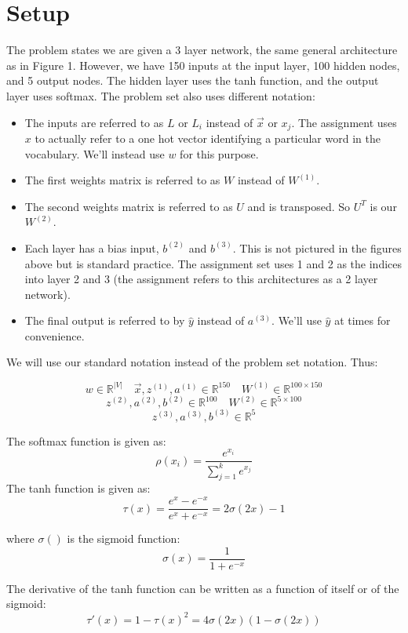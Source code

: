 \documentclass[]{article}
\begin{document}
\section{Setup}
The problem states we are given a 3 layer network, the same general architecture as in Figure 1. However, we have 150 inputs at the input layer, 100 hidden nodes, and 5 output nodes. The hidden layer uses the tanh function, and the output layer uses softmax. The problem set also uses different notation:
\begin{itemize}
	\item The inputs are referred to as $L$ or $L_i$ instead of $\vec{x}$ or $x_j$. The assignment uses $x$ to actually refer to a one hot vector identifying a particular word in the vocabulary. We'll instead use $w$ for this purpose.
	\item The first weights matrix is referred to as $W$ instead of $W^{(1)}$.
	\item The second weights matrix is referred to as $U$ and is transposed. So $U^T$ is our $W^{(2)}$.
	\item Each layer has a bias input, $b^{(2)}$ and $b^{(3)}$. This is not pictured in the figures above but is standard practice. The assignment set uses 1 and 2 as the indices into layer 2 and 3 (the assignment refers to this architectures as a 2 layer network).
	\item The final output is referred to by $\hat{y}$ instead of $a^{(3)}$. We'll use $\hat{y}$ at times for convenience.
\end{itemize}
	
We will use our standard notation instead of the problem set notation. Thus:

$$w \in \mathbb{R}^{|V|} \quad \vec{x},z^{(1)},a^{(1)} \in \mathbb{R}^{150} \quad W^{(1)} \in \mathbb{R}^{100\times150} $$
$$z^{(2)},a^{(2)},b^{(2)} \in \mathbb{R}^{100} \quad W^{(2)} \in \mathbb{R}^{5\times100}$$
$$z^{(3)},a^{(3)},b^{(3)} \in \mathbb{R}^5$$
\newline

The softmax function is given as:
$$\rho(x_i) = \frac{e^{x_i}}{\sum_{j=1}^k e^{x_j}}$$
The tanh function is given as: 
$$\tau(x) =\frac{e^x - e^{-x}}{e^x + e^{-x}} = 2\sigma(2x) - 1$$

where $\sigma()$ is the sigmoid function:
$$\sigma(x) = \frac{1}{1 + e^{-x}}$$

The derivative of the tanh function can be written as a function of itself or of the sigmoid:
$$ \tau'(x) = 1 - \tau(x)^2 = 4\sigma(2x)(1-\sigma(2x))$$
\end{document}
